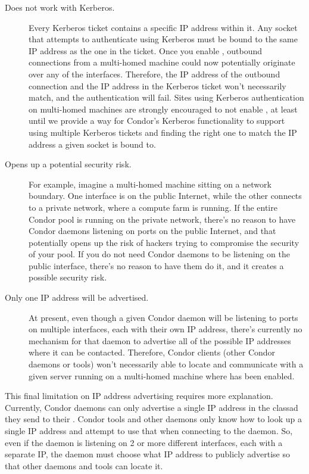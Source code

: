 \begin{description}

\item[Does not work with Kerberos.] 
  Every Kerberos ticket contains a specific IP address within it.
  Any socket that attempts to authenticate using Kerberos must be
  bound to the same IP address as the one in the ticket.
  Once you enable , outbound
  connections from a multi-homed machine could now potentially
  originate over any of the interfaces.
  Therefore, the IP address of the outbound connection and the IP
  address in the Kerberos ticket won't necessarily match, and the
  authentication will fail.
  Sites using Kerberos authentication on multi-homed machines are
  strongly encouraged to not enable ,
  at least until we provide a way for Condor's Kerberos functionality
  to support using multiple Kerberos tickets and finding the right one
  to match the IP address a given socket is bound to. 

\item[Opens up a potential security risk.]
  For example, imagine a multi-homed machine sitting on a network
  boundary.
  One interface is on the public Internet, while the other connects to
  a private network, where a compute farm is running.
  If the entire Condor pool is running on the private network, there's
  no reason to have Condor daemons listening on ports on the public
  Internet, and that potentially opens up the risk of hackers trying
  to compromise the security of your pool.
  If you do not need Condor daemons to be listening on the public
  interface, there's no reason to have them do it, and it creates a
  possible security risk.

\item[Only one IP address will be advertised.]
  At present, even though a given Condor daemon will be listening to
  ports on multiple interfaces, each with their own IP address,
  there's currently no mechanism for that daemon to advertise all of
  the possible IP addresses where it can be contacted.
  Therefore, Condor clients (other Condor daemons or tools) won't
  necessarily able to locate and communicate with a given server
  running on a multi-homed machine where
   has been enabled.

\end{description}

This final limitation on IP address advertising requires more
explanation.
Currently, Condor daemons can only advertise a single IP address in
the classad they send to their .
Condor tools and other daemons only know how to look up a single IP
address and attempt to use that when connecting to the daemon.
So, even if the daemon is listening on 2 or more different interfaces,
each with a separate IP, the daemon must choose what IP address to
publicly advertise so that other daemons and tools can locate it.

